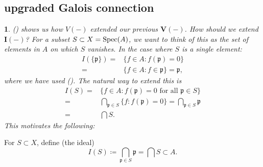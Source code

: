 \documentclass[12pt]{article}
\newtheorem{para}[theorem]{}
\begin{document}

\subsection{upgraded Galois connection} %

\begin{para}
	() shows us how $V(-)$ extended our previous $\mathbf{V}(-)$. How should we extend $\mathbf{I}(-)$? For a subset $S\subset X=\text{Spec}(A)$, we want to think of this as the set of elements in $A$ on which $S$ vanishes. In the case where $S$ is a single element:
	\begin{align*}
		I(\{\mathfrak{p}\})
		=& \{f\in A : f(\mathfrak{p})=0\} \\
		=& \{f\in A : f\in\mathfrak{p}\} = \mathfrak{p},
	\end{align*}
	where we have used (). The natural way to extend this is 
	\begin{align*}
		I(S) 
		=& \{f\in A : f(\mathfrak{p})=0 \text{ for all }\mathfrak{p}\in S\} \\
		=& \bigcap_{\mathfrak{p}\in S} \{f : f(\mathfrak{p})=0 \} = \bigcap_{\mathfrak{p}\in S}\mathfrak{p} \\
		=& \bigcap S.
	\end{align*}
	This motivates the following:
\end{para}

\begin{definition}
	For $S\subset X$, define (the ideal) 
	\begin{equation*}
		I(S) \coloneqq \bigcap_{\mathfrak{p}\in S}\mathfrak{p} = \bigcap S\subset A.
	\end{equation*}
\end{definition}
\end{document}
